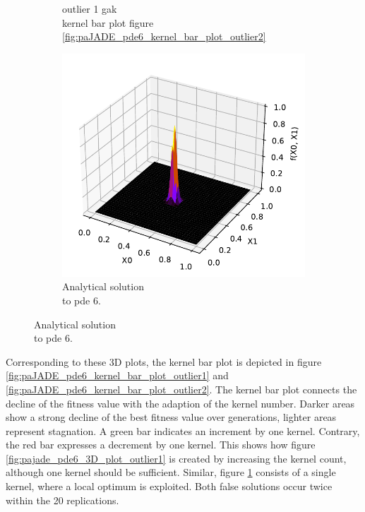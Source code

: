 \documentclass[./\jobname.tex]{subfiles}
\begin{document}
\begin{figure}[H]
\begin{subfigure}[b]{0.333\linewidth}
		\caption{outlier 1 \gls{gak}\\ kernel bar plot figure \ref{fig:paJADE_pde6_kernel_bar_plot_outlier2}}
		\label{fig:pajade_pde6_3D_plot_outlier2}
	\end{subfigure}%
	\begin{subfigure}[b]{0.333\linewidth}
		\centering
		\includegraphics[width=1\textwidth]{../../code/testbed/pde6/sol_pde_6.pdf}
		\caption{Analytical solution \\to \gls{pde} 6.}
		\label{fig:pde6_analytical_solution}
	\end{subfigure}%
	\label{fig:paJADE_pde6_3D_plot_outlier}
\end{figure}

Corresponding to these 3D plots, the kernel bar plot is depicted in figure \ref{fig:paJADE_pde6_kernel_bar_plot_outlier1} and \ref{fig:paJADE_pde6_kernel_bar_plot_outlier2}. The kernel bar plot connects the decline of the fitness value with the adaption of the kernel number. Darker areas show a strong decline of the best fitness value over generations, lighter areas represent stagnation. A green bar indicates an increment by one kernel. Contrary, the red bar expresses a decrement by one kernel. This shows how figure \ref{fig:pajade_pde6_3D_plot_outlier1} is created by increasing the kernel count, although one kernel should be sufficient. Similar, figure \ref{fig:pajade_pde6_3D_plot_outlier2} consists of a single kernel, where a local optimum is exploited. Both false solutions occur twice within the 20 replications. 
\end{document}
